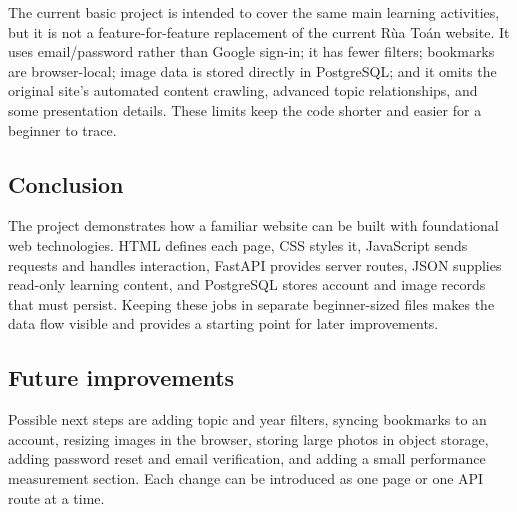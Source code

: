 The current basic project is intended to cover the same main learning activities, but it is not a feature-for-feature replacement of the current Rùa Toán website. It uses email/password rather than Google sign-in; it has fewer filters; bookmarks are browser-local; image data is stored directly in PostgreSQL; and it omits the original site's automated content crawling, advanced topic relationships, and some presentation details. These limits keep the code shorter and easier for a beginner to trace.

\subsection{Conclusion}
The project demonstrates how a familiar website can be built with foundational web technologies. HTML defines each page, CSS styles it, JavaScript sends requests and handles interaction, FastAPI provides server routes, JSON supplies read-only learning content, and PostgreSQL stores account and image records that must persist. Keeping these jobs in separate beginner-sized files makes the data flow visible and provides a starting point for later improvements.

\subsection{Future improvements}
Possible next steps are adding topic and year filters, syncing bookmarks to an account, resizing images in the browser, storing large photos in object storage, adding password reset and email verification, and adding a small performance measurement section. Each change can be introduced as one page or one API route at a time.
